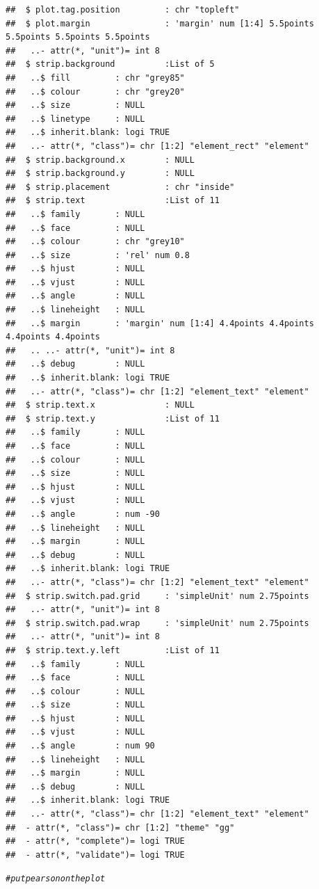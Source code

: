 \documentclass{article}\usepackage[]{graphicx}\usepackage[]{color}
\makeatletter
\newcommand{\hlcom}[1]{\textcolor[rgb]{0.678,0.584,0.686}{\textit{#1}}}%
\newenvironment{kframe}{%
 \def\at@end@of@kframe{}%
 \ifinner\ifhmode%
  \def\at@end@of@kframe{\end{minipage}}%
  \begin{minipage}{\columnwidth}%
 \fi\fi%
 \def\FrameCommand##1{\hskip\@totalleftmargin \hskip-\fboxsep
 \colorbox{shadecolor}{##1}\hskip-\fboxsep
     \hskip-\linewidth \hskip-\@totalleftmargin \hskip\columnwidth}%
 \MakeFramed {\advance\hsize-\width
   \@totalleftmargin\z@ \linewidth\hsize
   \@setminipage}}%
 {\par\unskip\endMakeFramed%
 \at@end@of@kframe}
\newenvironment{knitrout}{}{} %
\makeatother
\begin{document}
\begin{enumerate}
\begin{enumerate}
\begin{knitrout}
\begin{kframe}
\begin{verbatim}
##  $ plot.tag.position         : chr "topleft"
##  $ plot.margin               : 'margin' num [1:4] 5.5points 5.5points 5.5points 5.5points
##   ..- attr(*, "unit")= int 8
##  $ strip.background          :List of 5
##   ..$ fill         : chr "grey85"
##   ..$ colour       : chr "grey20"
##   ..$ size         : NULL
##   ..$ linetype     : NULL
##   ..$ inherit.blank: logi TRUE
##   ..- attr(*, "class")= chr [1:2] "element_rect" "element"
##  $ strip.background.x        : NULL
##  $ strip.background.y        : NULL
##  $ strip.placement           : chr "inside"
##  $ strip.text                :List of 11
##   ..$ family       : NULL
##   ..$ face         : NULL
##   ..$ colour       : chr "grey10"
##   ..$ size         : 'rel' num 0.8
##   ..$ hjust        : NULL
##   ..$ vjust        : NULL
##   ..$ angle        : NULL
##   ..$ lineheight   : NULL
##   ..$ margin       : 'margin' num [1:4] 4.4points 4.4points 4.4points 4.4points
##   .. ..- attr(*, "unit")= int 8
##   ..$ debug        : NULL
##   ..$ inherit.blank: logi TRUE
##   ..- attr(*, "class")= chr [1:2] "element_text" "element"
##  $ strip.text.x              : NULL
##  $ strip.text.y              :List of 11
##   ..$ family       : NULL
##   ..$ face         : NULL
##   ..$ colour       : NULL
##   ..$ size         : NULL
##   ..$ hjust        : NULL
##   ..$ vjust        : NULL
##   ..$ angle        : num -90
##   ..$ lineheight   : NULL
##   ..$ margin       : NULL
##   ..$ debug        : NULL
##   ..$ inherit.blank: logi TRUE
##   ..- attr(*, "class")= chr [1:2] "element_text" "element"
##  $ strip.switch.pad.grid     : 'simpleUnit' num 2.75points
##   ..- attr(*, "unit")= int 8
##  $ strip.switch.pad.wrap     : 'simpleUnit' num 2.75points
##   ..- attr(*, "unit")= int 8
##  $ strip.text.y.left         :List of 11
##   ..$ family       : NULL
##   ..$ face         : NULL
##   ..$ colour       : NULL
##   ..$ size         : NULL
##   ..$ hjust        : NULL
##   ..$ vjust        : NULL
##   ..$ angle        : num 90
##   ..$ lineheight   : NULL
##   ..$ margin       : NULL
##   ..$ debug        : NULL
##   ..$ inherit.blank: logi TRUE
##   ..- attr(*, "class")= chr [1:2] "element_text" "element"
##  - attr(*, "class")= chr [1:2] "theme" "gg"
##  - attr(*, "complete")= logi TRUE
##  - attr(*, "validate")= logi TRUE
\end{verbatim}
\begin{alltt}
  \hlcom{#put pearson on the plot}
\end{alltt}
\end{kframe}
\end{knitrout}

\end{enumerate}
\end{enumerate}
\end{document}
